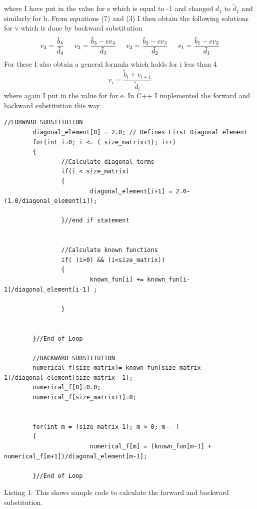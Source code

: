 \documentclass[11pt,a4wide]{article}
\begin{document}
where I have put in the value for e which is equal to -1 and changed $d_1$ to $\tilde{d}_1$ and similarly for b. From equations (7)
and (3) I then obtain the following solutions for v which is done by backward substitution
\begin{equation}
 	v_4 =\frac{\tilde{b}_4}{\tilde{d}_4} \hspace{0.5cm} v_3 =\frac{\tilde{b}_3 -ev_4}{\tilde{d}_3} \hspace{0.5cm} 			  
	v_2=\frac{\tilde{b}_2 -ev_3}{\tilde{d}_2} \hspace{0.5cm} v_1 =\frac{\tilde{b}_1 -ev_2}{\tilde{d}_1}
\end{equation}
For these I also obtain a general formula which holds for i less than 4
\begin{equation}
	v_i =\frac{\tilde{b}_i + v_{i+1}}{\tilde{d}_i}
\end{equation}
where again I put in the value for for e. In C++ I implemented the forward and backward substitution this way 
 
\begin{lstlisting}[title={Project1}]
        //FORWARD SUBSTITUTION
        diagonal_element[0] = 2.0; // Defines First Diagonal element    
        for(int i=0; i <= ( size_matrix+1); i++)
        {
                //Calculate diagonal terms
                if(i < size_matrix)
                {
                        diagonal_element[i+1] = 2.0-(1.0/diagonal_element[i]);

                }//end if statement


                //Calculate known functions
                if( (i>0) && (i<size_matrix))
                {
                        known_fun[i] += known_fun[i-1]/diagonal_element[i-1] ;

                }


        }//End of Loop
        
        //BACKWARD SUBSTITUTION 
        numerical_f[size_matrix]= known_fun[size_matrix-1]/diagonal_element[size_matrix -1];
        numerical_f[0]=0.0;
        numerical_f[size_matrix+1]=0;


        for(int m = (size_matrix-1); m > 0; m-- )
        {
                        numerical_f[m] = (known_fun[m-1] + numerical_f[m+1])/diagonal_element[m-1];

        }//End of Loop
\end{lstlisting}
\begin{center}
Listing 1: This shows sample code to calculate the forward and backward substitution.
\end{center}
\end{document}
